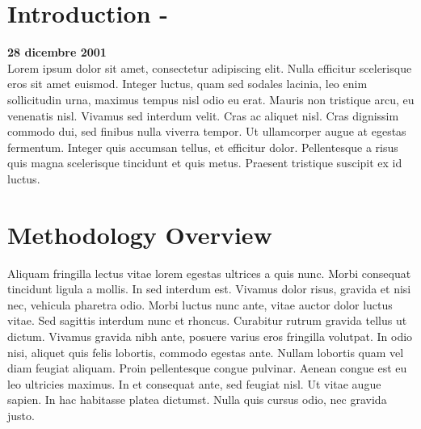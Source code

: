 \documentclass[
10pt, %
a4paper, %
twocolumn, %
landscape %
]{article}
\begin{document}


\thispagestyle{plain} %


\noindent
\section*{Introduction - } %
{\bfseries 28 dicembre 2001 }\\[6pt]
Lorem ipsum dolor sit amet, consectetur adipiscing elit. Nulla efficitur scelerisque eros sit amet euismod. Integer luctus, quam sed sodales lacinia, leo enim sollicitudin urna, maximus tempus nisl odio eu erat. Mauris non tristique arcu, eu venenatis nisl. Vivamus sed interdum velit. Cras ac aliquet nisl. Cras dignissim commodo dui, sed finibus nulla viverra tempor. Ut ullamcorper augue at egestas fermentum. Integer quis accumsan tellus, et efficitur dolor. Pellentesque a risus quis magna scelerisque tincidunt et quis metus. Praesent tristique suscipit ex id luctus.


\section{Methodology Overview} %
\date{03081888}
Aliquam fringilla lectus vitae lorem egestas ultrices a quis nunc. Morbi consequat tincidunt ligula a mollis. In sed interdum est. Vivamus dolor risus, gravida et nisi nec, vehicula pharetra odio. Morbi luctus nunc ante, vitae auctor dolor luctus vitae. Sed sagittis interdum nunc et rhoncus. Curabitur rutrum gravida tellus ut dictum. Vivamus gravida nibh ante, posuere varius eros fringilla volutpat. In odio nisi, aliquet quis felis lobortis, commodo egestas ante. Nullam lobortis quam vel diam feugiat aliquam. Proin pellentesque congue pulvinar. Aenean congue est eu leo ultricies maximus. In et consequat ante, sed feugiat nisl. Ut vitae augue sapien. In hac habitasse platea dictumst. Nulla quis cursus odio, nec gravida justo.
\end{document}
